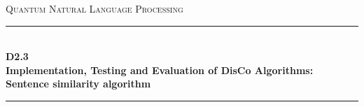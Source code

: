 \documentclass[11pt]{article}
\begin{document}
\begin{titlepage}
\newcommand{\HRule}{\rule{\linewidth}{0.1mm}} 
\center %
 
\setlength{\arrayrulewidth}{1mm}
\setlength{\tabcolsep}{18pt}
\renewcommand{\arraystretch}{2.5}
 
\vfill
\textsc{\LARGE Quantum Natural Language Processing}
\vfill
\HRule \\[0.4cm]
{ \Large \bfseries D2.3} \\[0.3cm]
{ \Large \bfseries Implementation, Testing and Evaluation of DisCo Algorithms: \\[0.1cm]Sentence similarity algorithm}\\[0.1cm]
\HRule \\[1.5cm]
 

\end{titlepage}
\end{document}
